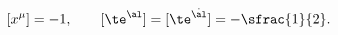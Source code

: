 \begin{equation} \label{coord}
[x^\mu]=-1, \qquad [\te^\al]=[\te^{\dot{\al}}]=-\sfrac{1}{2}.
\end{equation}

